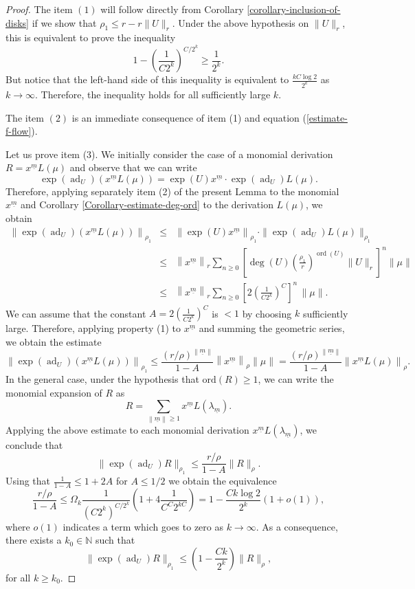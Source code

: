 \documentclass[10pt,a4paper]{amsart}
\newcommand{\N}{\mathbb{N}}
\newcommand{\ad}{\operatorname{ad}}
\newcommand{\ord}{\mathrm{ord}}
\newcommand{\tmop}[1]{{\operatorname{#1}}}
\newcommand{\um}{{\underline m}}
\begin{document}
\begin{proof}
  The item $(1)$ will follow directly from Corollary
  \ref{corollary-inclusion-of-disks} if we show that $\rho_1 \leq r - r
  \| U \|_r$. Under the above hypothesis on $\|U\|_r$, this is equivalent to prove the inequality
  \[ 1 - \left( \frac{1}{C 2^k} \right)^{C / 2^k} \geq \frac{1}{2^k}. \]
  But notice that the left-hand side of this inequality is equivalent to
  $\frac{k C\log 2}{2^k}$ as $k \rightarrow \infty$. Therefore, the
  inequality holds for all sufficiently large $k$.
  
  The item $(2)$ is an immediate consequence of item (1) and equation
  (\ref{estimate-f-flow}).
  
  Let us prove item (3). We initially consider the case of a monomial
  derivation $R = x^{\um} L (\mu)$ and observe that we can write
  \[ \exp (\ad_U) \left( x^{\um} L (\mu) \right) = \exp (U) x^{\um}
     \cdot \exp (\ad_U) L (\mu). \]
  Therefore, applying separately item (2) of the present Lemma to the monomial $x^{\um}$ and Corollary
  \ref{Corollary-estimate-deg-ord} to the derivation $L (\mu)$, we obtain
  \begin{eqnarray*}
    \left\| \exp (\ad_U) \left( x^{\um} L (\mu) \right)
    \right\|_{\rho_1} & \leq & \left\| \exp (U) x^{\um} \right\|_{\rho_1}
    \cdot \| \exp (\ad_U) L (\mu) \|_{\rho_1}\\
    & \leq & \left\| x^{\um} \right\|_r  \sum_{n \geq 0} \left[
    \deg (U)  \left( \frac{\rho_1}{r} \right)^{\tmop{ord} (U)}  \| U \|_r
    \right]^n \| \mu \|\\
    & \leq & \left\| x^{\um} \right\|_r \sum_{n \geq 0} \left[ 2
    \left( \frac{1}{C 2^k} \right)^C  \right]^n\, \| \mu \|.
  \end{eqnarray*}
  We can assume that the constant $A = 2 \left( \frac{1}{C 2^k} \right)^C$ is
  $< 1$ by choosing $k$ sufficiently large. Therefore, applying property (1)
  to $x^{\um}$ and summing the geometric series, we obtain the estimate
  \[ \left\| \exp (\ad_U) \left( x^{\um} L (\mu) \right)
     \right\|_{\rho_1} \leq \frac{\left( r/\rho \right)^{\left\|
     \um \right\|}}{1 - A}  \left\| x^{\um} \right\|_{\rho} \| \mu \| =
     \frac{\left( r/\rho \right)^{\left\| \um \right\|}}{1 - A} 
     \left\| x^{\um} L (\mu) \right\|_{\rho} . \]
  In the general case, under the hypothesis that $\ord(R) \geq 1$, we
  can write the monomial expansion of $R$ as
  \[ R = \sum_{\left\| \um \right\| \geq 1} x^{\um} L \left( \lambda_{\um}
     \right). \]
  Applying the above estimate to each monomial derivation $x^{\um} L \left(
  \lambda_{\um} \right)$, we conclude that
  \[ \| \exp (\ad_U) R \|_{\rho_1} \leq \frac{r / \rho}{1 - A}  \|
     R \|_{\rho}. \]
Using that $\frac{1}{1 - A} \leqslant 1 + 2 A$ for $A \leqslant 1 / 2$ we obtain the equivalence
\[ \frac{r / \rho}{1 - A} \leqslant \Omega_k \frac{1}{(C 2^k)^{C / 2^k}}
   \left( 1 + 4 \frac{1}{C^C 2^{k C}} \right) = 1 - \frac{C k \log 2}{2^k}(1+o(1)),
\]
where $o(1)$ indicates a term which goes to zero as $k \rightarrow \infty$. As a consequence, there exists a $k_0 \in \N$ such that
\[ \| \exp (\tmop{ad}_U) R \|_{\rho_1} \leqslant \left( 1 - \frac{C k}{2^k}
   \right)  \| R \|_{\rho}, \]
for all $k \ge k_0$.      
\end{proof}
\end{document}
